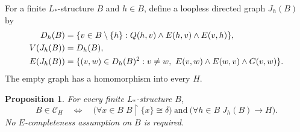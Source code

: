 \documentclass{article}
\numberwithin{equation}{section}
\newtheorem{proposition}[theorem]{Proposition}
\theoremstyle{definition}
\newcommand{\res}{\mathbin{\upharpoonright}}
\begin{document}
For a finite $L_*$-structure $B$ and $h\in B$, define a loopless directed
graph $J_h(B)$ by
\begin{align}
 D_h(B)&=\{v\in B\setminus\{h\}:Q(h,v)\wedge E(h,v)\wedge E(v,h)\},
 \label{neg:local-domain}\\
 V(J_h(B))&=D_h(B),\notag\\
 E(J_h(B))&=\{(v,w)\in D_h(B)^2:v\ne w,
            \ E(v,w)\wedge E(w,v)\wedge G(v,w)\}.
 \label{neg:local-arcs}
\end{align}
The empty graph has a homomorphism into every $H$.

\begin{proposition}\label{neg:age-characterization}
For every finite $L_*$-structure $B$,
\begin{equation}\label{neg:age-formula}
 B\in\mathcal C_H
 \quad\Longleftrightarrow\quad
 \bigl(\forall x\in B\; B\res\{x\}\cong\delta\bigr)
 \ \text{and}\ \bigl(\forall h\in B\;J_h(B)\to H\bigr).
\end{equation}
No $E$-completeness assumption on $B$ is required.
\end{proposition}
\end{document}
